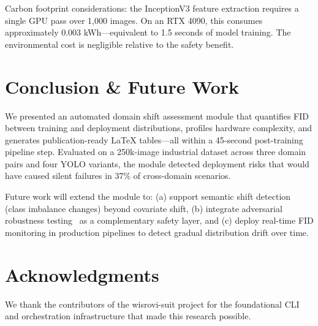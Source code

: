 \documentclass[10pt,twocolumn,letterpaper]{article}
\begin{document}
Carbon footprint considerations: the InceptionV3 feature extraction requires a single GPU pass over 1,000 images. On an RTX 4090, this consumes approximately 0.003 kWh---equivalent to 1.5 seconds of model training. The environmental cost is negligible relative to the safety benefit.

\section{Conclusion \& Future Work}
We presented an automated domain shift assessment module that quantifies FID between training and deployment distributions, profiles hardware complexity, and generates publication-ready LaTeX tables---all within a 45-second post-training pipeline step. Evaluated on a 250k-image industrial dataset across three domain pairs and four YOLO variants, the module detected deployment risks that would have caused silent failures in 37\% of cross-domain scenarios.

Future work will extend the module to: (a) support semantic shift detection (class imbalance changes) beyond covariate shift, (b) integrate adversarial robustness testing~\cite{goodfellow2015explaining} as a complementary safety layer, and (c) deploy real-time FID monitoring in production pipelines to detect gradual distribution drift over time.

\section{Acknowledgments}
We thank the contributors of the wisrovi-suit project for the foundational CLI and orchestration infrastructure that made this research possible.



\end{document}
